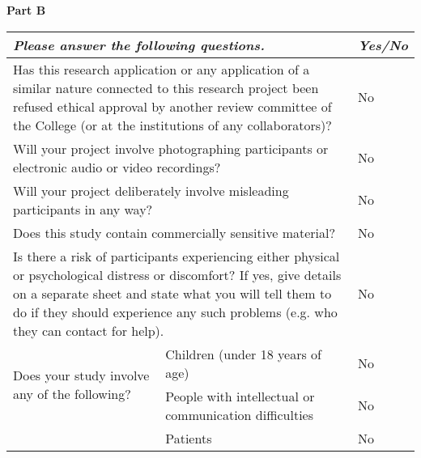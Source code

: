 
\newpage

\begin{tcolorbox}
    \centering
    \textbf{Part B}
\end{tcolorbox}

\begin{table}[ht]
    \centering
    \begin{tabular}{|ll|l|}
    \hline
    \multicolumn{2}{|l|}{\textit{\textbf{Please answer the following questions.}}}                                                                & \textit{\textbf{Yes/No}} \\ \hline
    \multicolumn{2}{|p{0.75\linewidth}|}{Has this research application or any application of a similar nature connected to this research project been refused ethical approval by another review committee of the College (or at the institutions of any collaborators)?} &
      \multicolumn{1}{l|}{No} \\ \hline
    \multicolumn{2}{|l|}{Will your project involve photographing participants or electronic audio or video recordings?}                           & \multicolumn{1}{l|}{No}  \\ \hline
    \multicolumn{2}{|l|}{Will your project deliberately involve misleading participants in any way?}                                              & \multicolumn{1}{l|}{No}  \\ \hline
    \multicolumn{2}{|l|}{Does this study contain commercially sensitive material?}                                                                & \multicolumn{1}{l|}{No}  \\ \hline
    \multicolumn{2}{|p{0.75\linewidth}|}{Is there a risk of participants experiencing either physical or psychological distress or discomfort?  If yes, give details on a separate sheet and state what you will tell them to do if they should experience any such problems (e.g. who they can contact for help).} &
      \multicolumn{1}{l|}{No} \\ \hline
    \multicolumn{1}{|l|}{\multirow{2}{*}{Does your study involve any of the following?}} & Children (under 18 years of age)                       & \multicolumn{1}{l|}{No}  \\ \cline{2-3} 
    \multicolumn{1}{|l|}{}                                                               & People with intellectual or communication difficulties & \multicolumn{1}{l|}{No}  \\ \cline{2-3} 
    \multicolumn{1}{|l|}{}                                                               & Patients                                               & \multicolumn{1}{l|}{No}  \\ \hline
    \end{tabular}
\end{table}



